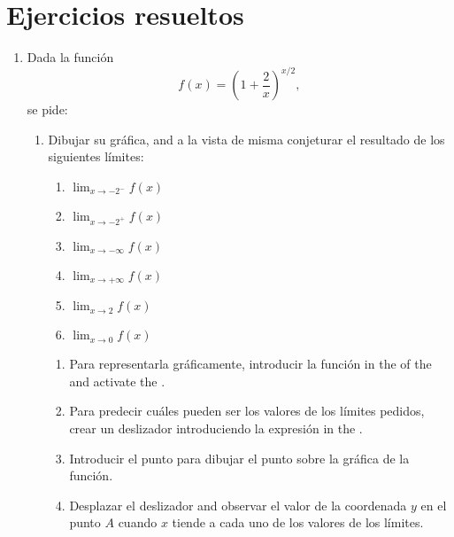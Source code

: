 

\section{Ejercicios resueltos}
\begin{enumerate}[leftmargin=*]
\item Dada la función
      \[
      f(x)=\left( 1+\frac{2}{x}\right) ^{x/2},
      \]
      se pide:

      \begin{enumerate}
      \item Dibujar su gráfica, and a la vista de misma conjeturar el resultado de los siguientes límites:
            \begin{multicols}{2}
            \begin{enumerate}
            \item $\lim_{x\rightarrow -2^-} f(x)$
            \item $\lim_{x\rightarrow -2^+} f(x)$
            \item $\lim_{x\rightarrow -\infty} f(x)$
            \item $\lim_{x\rightarrow +\infty} f(x)$
            \item $\lim_{x\rightarrow 2} f(x)$
            \item $\lim_{x\rightarrow 0} f(x)$
            \end{enumerate}
            \end{multicols}

            \begin{indication}
            \begin{enumerate}
            \item Para representarla gráficamente, introducir la función  in the  of the   and activate the .
            \item Para predecir cuáles pueden ser los valores de los límites pedidos, crear un deslizador introduciendo la expresión  in the .
            \item Introducir el punto  para dibujar el punto sobre la gráfica de la función.
            \item Desplazar el deslizador and observar el valor de la coordenada $y$ en el punto $A$ cuando $x$ tiende a cada uno de los valores de los límites.
            \end{enumerate}
            \end{indication}


\end{enumerate}
\end{enumerate}
